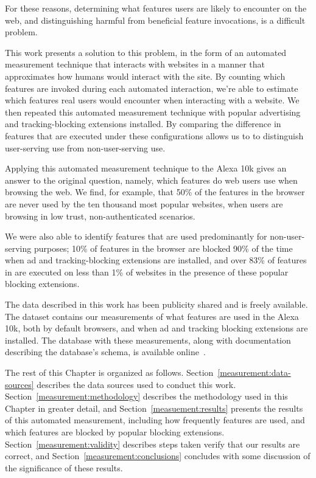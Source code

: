 For these reasons, determining what \WAPI features users are likely
to encounter on the web, and distinguishing harmful from beneficial feature
invocations, is a difficult problem.

This work presents a solution to this problem, in the form of an automated
measurement technique that interacts with websites in a manner that
approximates how humans would interact with the site.  By counting which
features are invoked during each automated interaction, we're able to estimate
which features real users would encounter when interacting with a website. We
then repeated this automated measurement technique with popular advertising and
tracking-blocking extensions installed.  By comparing the difference in
features that are executed under these configurations allows us to to
distinguish user-serving \WAPI use from non-user-serving \WAPI use.

Applying this automated measurement technique to the Alexa 10k gives an
answer to the original question, namely, which \WAPI features do web users use when
browsing the web.  We find, for example, that 50\% of the \WAPI features in the
browser are never used by the ten thousand most popular websites, when users
are browsing in low trust, non-authenticated scenarios.

We were also able to identify features that are used
predominantly for non-user-serving purposes; 10\% of \WAPI features in the
browser are blocked 90\% of the time when ad and tracking-blocking extensions
are installed,  and over 83\% of features in are executed on less than 1\% of
websites in the presence of these popular blocking extensions.

The data described in this work has been publicity shared and is freely
available.  The dataset contains our measurements of what \JS features are used
in the Alexa 10k, both by default browsers, and when ad and tracking blocking
extensions are installed.  The database with these measurements, along with
documentation describing the database's schema, is available
online~\cite{snyderp2016webapidata}.

The rest of this Chapter is organized as follows.
Section~\ref{measurement:data-sources} describes the data sources used to
conduct this work. Section~\ref{measurement:methodology} describes the
methodology used in this Chapter in greater detail, and
Section~\ref{measuement:results} presents the results of this automated
measurement, including how frequently features are used, and which features are
blocked by popular blocking extensions.  Section~\ref{measurement:validity}
describes steps taken verify that our results are correct, and
Section~\ref{measurement:conclusions} concludes with some discussion of the
significance of these results.
